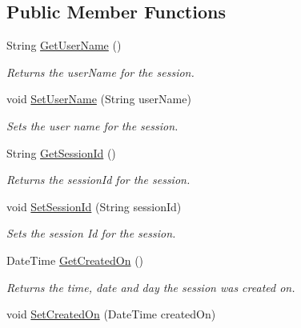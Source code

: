 \subsection*{Public Member Functions}
\begin{DoxyCompactItemize}
\item 
String \hyperlink{classcom_1_1shephertz_1_1app42_1_1paas_1_1sdk_1_1csharp_1_1session_1_1_session_a065164248c206359fbd899b3c5400ad7}{Get\+User\+Name} ()
\begin{DoxyCompactList}\small\item\em Returns the user\+Name for the session. \end{DoxyCompactList}\item 
void \hyperlink{classcom_1_1shephertz_1_1app42_1_1paas_1_1sdk_1_1csharp_1_1session_1_1_session_ace16ebbf2b1564c9531f455f66c543fe}{Set\+User\+Name} (String user\+Name)
\begin{DoxyCompactList}\small\item\em Sets the user name for the session. \end{DoxyCompactList}\item 
String \hyperlink{classcom_1_1shephertz_1_1app42_1_1paas_1_1sdk_1_1csharp_1_1session_1_1_session_aef4f57944b2830bf8b0bb62294e58bef}{Get\+Session\+Id} ()
\begin{DoxyCompactList}\small\item\em Returns the session\+Id for the session. \end{DoxyCompactList}\item 
void \hyperlink{classcom_1_1shephertz_1_1app42_1_1paas_1_1sdk_1_1csharp_1_1session_1_1_session_a9d63214a81fb481211f4585b7a0ee176}{Set\+Session\+Id} (String session\+Id)
\begin{DoxyCompactList}\small\item\em Sets the session Id for the session. \end{DoxyCompactList}\item 
Date\+Time \hyperlink{classcom_1_1shephertz_1_1app42_1_1paas_1_1sdk_1_1csharp_1_1session_1_1_session_ae2da9f1c9723b1387f354d1402c89e35}{Get\+Created\+On} ()
\begin{DoxyCompactList}\small\item\em Returns the time, date and day the session was created on. \end{DoxyCompactList}\item 
void \hyperlink{classcom_1_1shephertz_1_1app42_1_1paas_1_1sdk_1_1csharp_1_1session_1_1_session_aff1bdd61ddb50623cf93e4a8d80bfe27}{Set\+Created\+On} (Date\+Time created\+On)

\end{DoxyCompactItemize}
